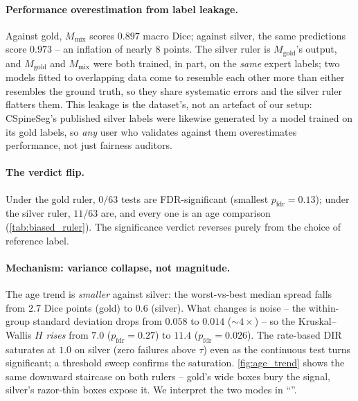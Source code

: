 \paragraph{Performance overestimation from label leakage.}
Against gold, $M_{\mathrm{mix}}$ scores $0.897$ macro Dice; against silver, the same
predictions score $0.973$ -- an inflation of nearly $8$ points. The silver ruler is
$M_{\mathrm{gold}}$'s output, and $M_{\mathrm{gold}}$ and $M_{\mathrm{mix}}$ were both
trained, in part, on the \emph{same} expert labels; two models fitted to overlapping
data come to resemble each other more than either resembles the ground truth, so they
share systematic errors and the silver ruler flatters them. This leakage is the
dataset's, not an artefact of our setup: CSpineSeg's published silver labels were
likewise generated by a model trained on its gold labels, so \emph{any} user who
validates against them overestimates performance, not just fairness auditors.

\paragraph{The verdict flip.}
Under the gold ruler, $0/63$ tests are FDR-significant (smallest
$p_{\mathrm{fdr}} = 0.13$); under the silver ruler, $11/63$ are, and every one is an
age comparison (\autoref{tab:biased_ruler}). The significance verdict reverses purely
from the choice of reference label.

\paragraph{Mechanism: variance collapse, not magnitude.}
The age trend is \emph{smaller} against silver: the worst-vs-best median spread
falls from $2.7$ Dice points (gold) to $0.6$ (silver). What changes is noise -- the
within-group standard deviation drops from $0.058$ to $0.014$ (${\sim}4\times$) -- so
the Kruskal--Wallis $H$ \emph{rises} from $7.0$ ($p_{\mathrm{fdr}} = 0.27$) to
$11.4$ ($p_{\mathrm{fdr}} = 0.026$). The rate-based DIR saturates at $1.0$ on silver
(zero failures above $\tau$) even as the continuous test turns significant; a
threshold sweep confirms the saturation. \autoref{fig:age_trend} shows the same
downward staircase on both rulers -- gold's wide boxes bury the signal, silver's
razor-thin boxes expose it. We interpret the two modes in
``''.

